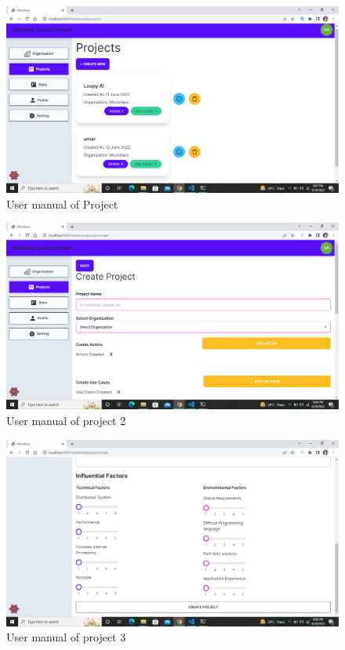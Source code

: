 \begin{figure}[H]
    \centering
    \includegraphics[scale=0.4]{./diagrams/user-manual/Screenshot (22).png}
    \caption{User manual of Project}
    \label{fig:user-1}

\end{figure}

\begin{figure}[H]
    \centering
    \includegraphics[scale=0.4]{./diagrams/user-manual/Screenshot (23).png}
    \caption{User manual of project 2}
    \label{fig:user-1}

\end{figure}

\begin{figure}[H]
    \centering
    \includegraphics[scale=0.4]{./diagrams/user-manual/Screenshot (24).png}
    \caption{User manual of project 3}
    \label{fig:user-1}

\end{figure}
